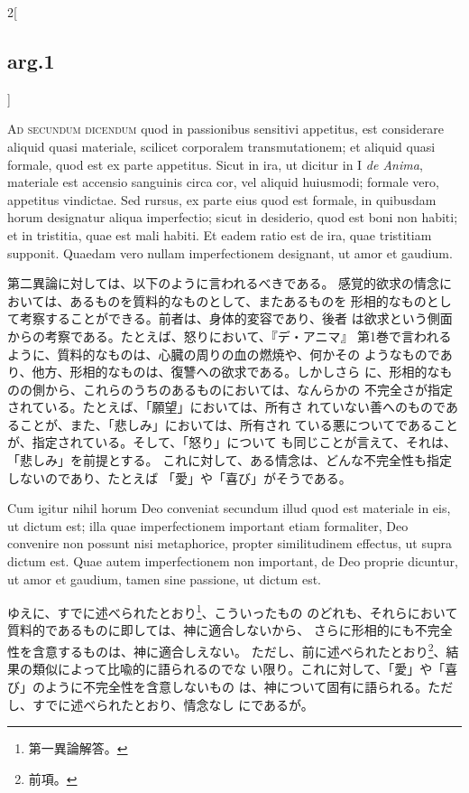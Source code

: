 \documentclass[paper=a4paper,fontsize=10pt,jafontsize=9pt,titlepage]{jlreq}
\begin{document}
\begin{paracol}{2}[\subsection{arg.1}]
\switchcolumn*[\subsection{ad.2}]


{\scshape Ad secundum dicendum} quod in passionibus
sensitivi appetitus, est considerare aliquid quasi materiale, scilicet
corporalem transmutationem; et aliquid quasi formale, quod est ex parte
appetitus. Sicut in ira, ut dicitur in I {\itshape de Anima}, materiale est
accensio sanguinis circa cor, vel aliquid huiusmodi; formale vero,
appetitus vindictae. Sed rursus, ex parte eius quod est formale, in
quibusdam horum designatur aliqua imperfectio; sicut in desiderio, quod
est boni non habiti; et in tristitia, quae est mali habiti. Et eadem
ratio est de ira, quae tristitiam supponit. Quaedam vero nullam
imperfectionem designant, ut amor et gaudium.

\switchcolumn

第二異論に対しては、以下のように言われるべきである。
感覚的欲求の情念においては、あるものを質料的なものとして、またあるものを
 形相的なものとして考察することができる。前者は、身体的変容であり、後者
 は欲求という側面からの考察である。たとえば、怒りにおいて、『デ・アニマ』
 第1巻で言われるように、質料的なものは、心臓の周りの血の燃焼や、何かその
 ようなものであり、他方、形相的なものは、復讐への欲求である。しかしさら
 に、形相的なものの側から、これらのうちのあるものにおいては、なんらかの
 不完全さが指定されている。たとえば、「願望」においては、所有さ
 れていない善へのものであることが、また、「悲しみ」においては、所有され
 ている悪についてであることが、指定されている。そして、「怒り」について
 も同じことが言えて、それは、「悲しみ」を前提とする。
これに対して、ある情念は、どんな不完全性も指定しないのであり、たとえば
 「愛」や「喜び」がそうである。

\switchcolumn*


Cum igitur nihil horum Deo
conveniat secundum illud quod est materiale in eis, ut dictum est; illa
quae imperfectionem important etiam formaliter, Deo convenire non
possunt nisi metaphorice, propter similitudinem effectus, ut supra
dictum est. Quae autem imperfectionem non important, de Deo proprie
dicuntur, ut amor et gaudium, tamen sine passione, ut dictum est.

\switchcolumn

ゆえに、すでに述べられたとおり\footnote{第一異論解答。}、こういったもの
 のどれも、それらにおいて質料的であるものに即しては、神に適合しないから、
さらに形相的にも不完全性を含意するものは、神に適合しえない。
 ただし、前に述べられたとおり\footnote{前項。}、結果の類似によって比喩的に語られるのでな
 い限り。これに対して、「愛」や「喜び」のように不完全性を含意しないもの
 は、神について固有に語られる。ただし、すでに述べられたとおり、情念なし
 にであるが。


\end{paracol}
\end{document}
